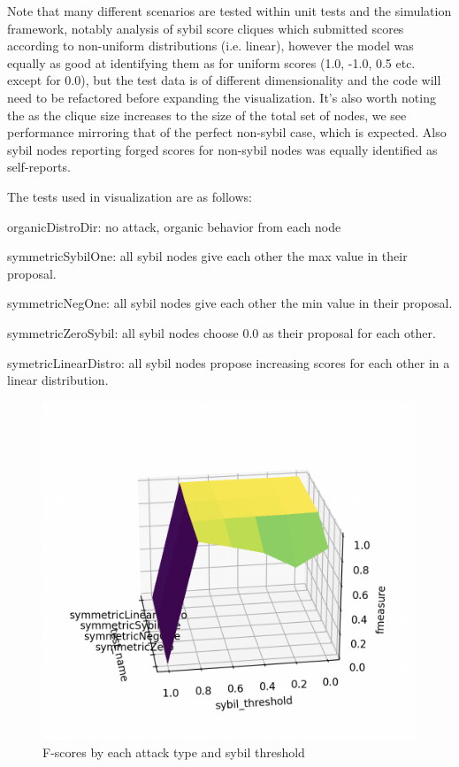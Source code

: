 \documentclass{article}
\begin{document}
Note that many different scenarios are tested within unit tests and the simulation framework, notably analysis of sybil score cliques which submitted scores according to non-uniform distributions (i.e. linear), however the model was equally as good at identifying them as for uniform scores (1.0, -1.0, 0.5 etc. except for 0.0), but the test data is of different dimensionality and the code will need to be refactored before expanding the visualization. It's also worth noting the as the clique size increases to the size of the total set of nodes, we see performance mirroring that of the perfect non-sybil case, which is expected. Also sybil nodes reporting forged scores for non-sybil nodes was equally identified as self-reports.

The tests used in visualization are as follows:

organicDistroDir: no attack, organic behavior from each node

symmetricSybilOne: all sybil nodes give each other the max value in their proposal.

symmetricNegOne: all sybil nodes give each other the min value in their proposal.

symmetricZeroSybil: all sybil nodes choose 0.0 as their proposal for each other.

symetricLinearDistro: all sybil nodes propose increasing scores for each other in a linear distribution.



\begin{figure}
\centering
\includegraphics[width=\textwidth, height=\textwidth]{f-score-surface-plot}
\caption{F-scores by each attack type and sybil threshold}
\end{figure}
\end{document}
